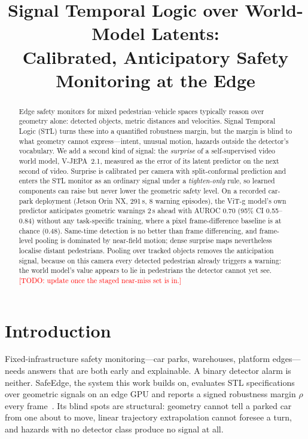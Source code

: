 \documentclass[11pt]{article}
\title{Signal Temporal Logic over World-Model Latents:\\
Calibrated, Anticipatory Safety Monitoring at the Edge}
\author{\todo{authors and affiliations}}
\date{\todo{date}}
\newcommand{\todo}[1]{\textcolor{red}{[TODO: #1]}}
\begin{document}
\maketitle

\begin{abstract}
Edge safety monitors for mixed pedestrian--vehicle spaces typically reason over
geometry alone: detected objects, metric distances and velocities. Signal
Temporal Logic (STL) turns these into a quantified robustness margin, but the
margin is blind to what geometry cannot express---intent, unusual motion,
hazards outside the detector's vocabulary. We add a second kind of signal:
the \emph{surprise} of a self-supervised video world model, V-JEPA~2.1, measured
as the error of its latent predictor on the next second of video. Surprise is
calibrated per camera with split-conformal prediction and enters the STL
monitor as an ordinary signal under a \emph{tighten-only} rule, so learned
components can raise but never lower the geometric safety level. On a recorded
car-park deployment (Jetson Orin NX, 291\,s, 8 warning episodes), the ViT-g
model's own predictor anticipates geometric warnings 2\,s ahead with AUROC
0.70 (95\% CI 0.55--0.84) without any task-specific training, where a pixel
frame-difference baseline is at chance (0.48). Same-time detection is no
better than frame differencing, and frame-level pooling is dominated by
near-field motion; dense surprise maps nevertheless localise distant
pedestrians. Pooling over tracked objects removes the anticipation signal,
because on this camera every detected pedestrian already triggers a warning:
the world model's value appears to lie in pedestrians the detector cannot yet
see. \todo{update once the staged near-miss set is in.}
\end{abstract}

\section{Introduction}
\label{sec:intro}

Fixed-infrastructure safety monitoring---car parks, warehouses, platform
edges---needs answers that are both early and explainable. A binary detector
alarm is neither. SafeEdge, the system this work builds on, evaluates STL
specifications over geometric signals on an edge GPU and reports a signed
robustness margin $\rho$ every frame~\citep{maler2004stl,donze2010robust,nickovic2020rtamt}.
Its blind spots are structural: geometry cannot tell a parked car from one
about to move, linear trajectory extrapolation cannot foresee a turn, and
hazards with no detector class produce no signal at all.
\end{document}
